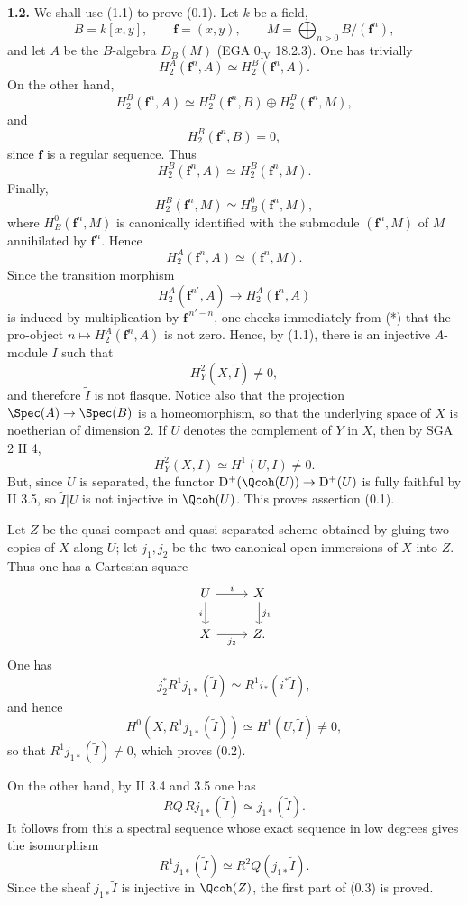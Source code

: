 \textbf{1.2.} We shall use (1.1) to prove (0.1). Let $k$ be a field,
\[
 B=k[x,y],\qquad \mathbf f=(x,y),\qquad
 M=\bigoplus_{n>0}B/(\mathbf f^n),
\]
and let $A$ be the $B$-algebra $D_B(M)$ (EGA $0_{\mathrm{IV}}$ 18.2.3). One has trivially
\[
 H_2^A(\mathbf f^n,A)\simeq H_2^B(\mathbf f^n,A).
\]
On the other hand,
\[
 H_2^B(\mathbf f^n,A)\simeq H_2^B(\mathbf f^n,B)\oplus H_2^B(\mathbf f^n,M),
\]
and
\[
 H_2^B(\mathbf f^n,B)=0,
\]
since $\mathbf f$ is a regular sequence. Thus
\[
 H_2^B(\mathbf f^n,A)\simeq H_2^B(\mathbf f^n,M).
\]
Finally,
\[
 H_2^B(\mathbf f^n,M)\simeq H_B^0(\mathbf f^n,M),
\]
where $H_B^0(\mathbf f^n,M)$ is canonically identified with the submodule $(\mathbf f^n,M)$ of $M$ annihilated by $\mathbf f^n$. Hence
\begin{equation}\tag{*}
 H_2^A(\mathbf f^n,A)\simeq (\mathbf f^n,M).
\end{equation}
Since the transition morphism
\[
 H_2^A(\mathbf f^{n'},A)\longrightarrow H_2^A(\mathbf f^n,A)
\]
is induced by multiplication by $\mathbf f^{\,n'-n}$, one checks immediately from (*) that the pro-object $n\mapsto H_2^A(\mathbf f^n,A)$ is not zero. Hence, by (1.1), there is an injective $A$-module $I$ such that
\[
 H^2_Y(X,\widetilde I)\ne0,
\]
and therefore $\widetilde I$ is not flasque. Notice also that the projection $\Spec(A)\to\Spec(B)$ is a homeomorphism, so that the underlying space of $X$ is noetherian of dimension $2$. If $U$ denotes the complement of $Y$ in $X$, then by SGA 2 II 4,
\[
 H^2_Y(X,I)\simeq H^1(U,I)\ne0.
\]
But, since $U$ is separated, the functor $\mathrm D^+(\Qcoh(U))\to\mathrm D^+(U)$ is fully faithful by II 3.5, so $\widetilde I|U$ is not injective in $\Qcoh(U)$. This proves assertion (0.1).

Let $Z$ be the quasi-compact and quasi-separated scheme obtained by gluing two copies of $X$ along $U$; let $j_1,j_2$ be the two canonical open immersions of $X$ into $Z$. Thus one has a Cartesian square
\[
\begin{tikzcd}
 U \arrow[r,"i"] \arrow[d,"i"'] & X \arrow[d,"j_1"]\\
 X \arrow[r,"j_2"'] & Z .
\end{tikzcd}
\]
One has
\[
 j_2^*R^1j_{1*}(\widetilde I)\simeq R^1i_*(i^*\widetilde I),
\]
and hence
\[
 H^0(X,R^1j_{1*}(\widetilde I))\simeq H^1(U,\widetilde I)\ne0,
\]
so that $R^1j_{1*}(\widetilde I)\ne0$, which proves (0.2).

On the other hand, by II 3.4 and 3.5 one has
\[
 RQ\,Rj_{1*}(\widetilde I)\simeq j_{1*}(\widetilde I).
\]
It follows from this a spectral sequence whose exact sequence in low degrees gives the isomorphism
\[
 R^1j_{1*}(\widetilde I)\simeq R^2Q(j_{1*}\widetilde I).
\]
Since the sheaf $j_{1*}\widetilde I$ is injective in $\Qcoh(Z)$, the first part of (0.3) is proved.

